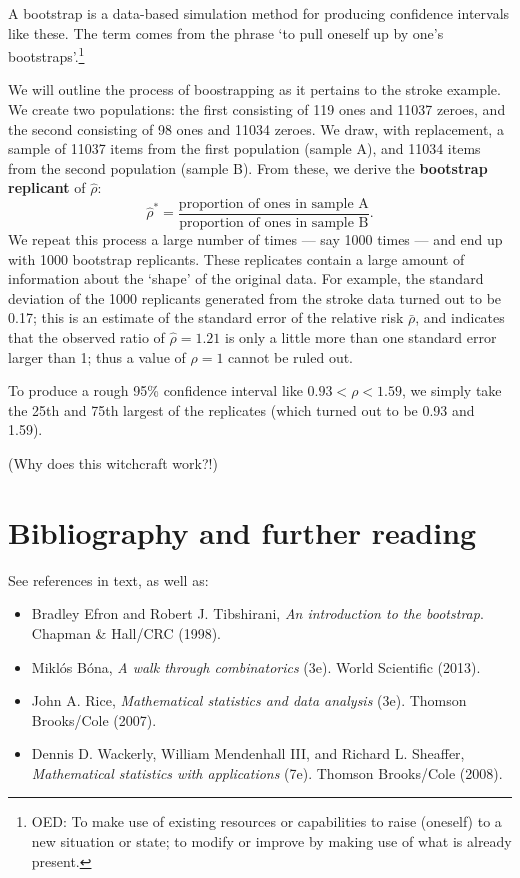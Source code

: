 \documentclass[a4paper,leqno]{article}
\numberwithin{equation}{section}
\theoremstyle{definition}
\theoremstyle{remark}
\newcommand{\df}{\textbf}
\begin{document}
A bootstrap is a data-based simulation method for producing confidence intervals like these. The term comes from the
phrase `to pull oneself up by one's bootstraps'.\footnote{OED: To make use of existing resources or capabilities to raise (oneself)
to a new situation or state; to modify or improve by making use of what is already present.}

We will outline the process of boostrapping as it pertains to the stroke example. We create two populations: the first consisting of
119 ones and 11037 zeroes, and the second consisting of 98 ones and 11034 zeroes. We draw, with replacement, a sample of 11037 items
from the first population (sample A), and 11034 items from the second population (sample B). From these, we derive the \df{bootstrap replicant} of $ \hat \rho $:
\begin{displaymath}
  \hat \rho^* = \frac{\text{proportion of ones in sample A}}{\text{proportion of ones in sample B}}.
\end{displaymath}
We repeat this process a large number of times --- say 1000 times --- and end up with 1000 bootstrap replicants. These replicates contain
a large amount of information about the `shape' of the original data. For example, the standard deviation of the 1000 replicants generated
from the stroke data turned out to be 0.17; this is an estimate of the standard error of the relative risk $ \bar \rho $, and indicates that
the observed ratio of $ \hat \rho = 1.21 $ is only a little more than one standard error larger than 1; thus a value of $ \rho = 1 $ cannot
be ruled out.

To produce a rough 95\% confidence interval like $ 0.93 < \rho < 1.59 $, we simply take the 25th and 75th largest of the replicates (which
turned out to be 0.93 and 1.59).

(Why does this witchcraft work?!)

\section*{Bibliography and further reading}
See references in text, as well as:
\begin{itemize}
  \item Bradley Efron and Robert J. Tibshirani, \textit{An introduction to the bootstrap}. Chapman \& Hall/CRC (1998).
  \item Mikl\'os B\'ona, \textit{A walk through combinatorics} (3e). World Scientific (2013).
  \item John A. Rice, \textit{Mathematical statistics and data analysis} (3e). Thomson Brooks/Cole (2007).
  \item Dennis D. Wackerly, William Mendenhall III, and Richard L. Sheaffer, \textit{Mathematical statistics with applications} (7e). Thomson Brooks/Cole (2008).
\end{itemize}
\end{document}
